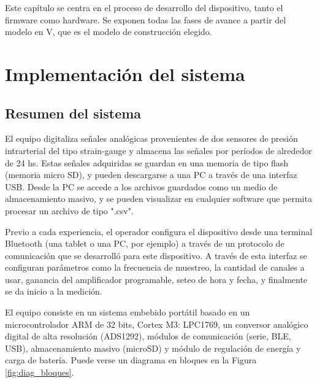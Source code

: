 


Este capítulo se centra en el proceso de desarrollo del dispositivo, tanto el firmware como hardware. Se exponen todas las fases de avance a partir del  modelo en V, que  es el modelo de construcción elegido.


\section{Implementación del sistema}

\subsection{Resumen del sistema}

El equipo digitaliza señales analógicas provenientes de dos sensores de presión intrarterial del tipo strain-gauge y almacena las señales por períodos de alrededor de 24 hs. Estas señales adquiridas se guardan en una memoria de tipo flash (memoria micro SD), y pueden descargarse a una PC a través de una interfaz USB. Desde la PC se accede a los archivos guardados como un medio de almacenamiento masivo, y se pueden visualizar en cualquier software que permita procesar un archivo de tipo ".csv".

Previo a cada experiencia, el operador configura el dispositivo desde una terminal Bluetooth (una tablet o una PC, por ejemplo) a través de un protocolo de comunicación que se desarrolló para este dispositivo. A través de esta interfaz se configuran parámetros como la frecuencia de muestreo, la cantidad de canales a usar, ganancia del amplificador programable, seteo de hora y fecha, y finalmente se da inicio a la medición. 

El equipo consiste en un sistema embebido portátil basado en un microcontrolador ARM de 32 bits, Cortex M3: LPC1769, un conversor analógico digital de alta resolución (ADS1292), módulos de comunicación (serie, BLE, USB), almacenamiento masivo (microSD) y módulo de regulación de energía y carga de batería. Puede verse un diagrama en bloques en la Figura \ref{fig:diag_bloques}. 


